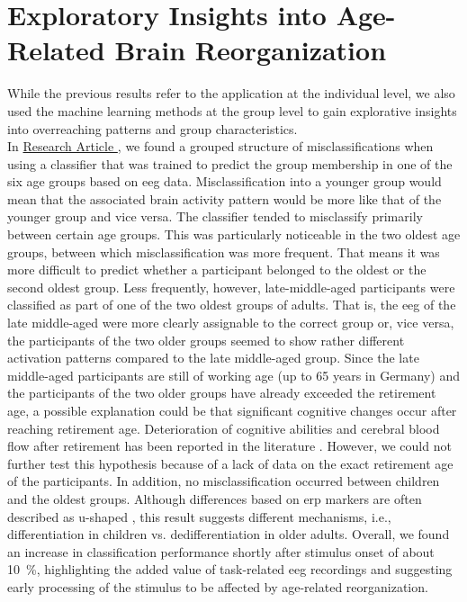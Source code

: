 \section{Exploratory Insights into Age-Related Brain Reorganization}
While the previous results refer to the application at the individual level, we also used the machine learning methods at the group level to gain explorative insights into overreaching patterns and group characteristics.\\
In \hyperref[results:paperII]{Research Article }, we found a grouped structure of misclassifications when using a classifier that was trained to predict the group membership in one of the six age groups based on \gls{eeg} data. Misclassification into a younger group would mean that the associated brain activity pattern would be more like that of the younger group and vice versa. The classifier tended to misclassify primarily between certain age groups. This was particularly noticeable in the two oldest age groups, between which misclassification was more frequent. That means it was more difficult to predict whether a participant belonged to the oldest or the second oldest group. Less frequently, however, late-middle-aged participants were classified as part of one of the two oldest groups of adults. That is, the \gls{eeg} of the late middle-aged were more clearly assignable to the correct group or, vice versa, the participants of the two older groups seemed to show rather different activation patterns compared to the late middle-aged group. Since the late middle-aged participants are still of working age (up to 65 years in Germany) and the participants of the two older groups have already exceeded the retirement age, a possible explanation could be that significant cognitive changes occur after reaching retirement age. Deterioration of cognitive abilities and cerebral blood flow after retirement has been reported in the literature \cite{Celidoni2017, Rohwedder2010, Rogers1990}. However, we could not further test this hypothesis because of a lack of data on the exact retirement age of the participants. In addition, no misclassification occurred between children and the oldest groups. Although differences based on \gls{erp} markers are often described as u-shaped \cite{Mueller2008, Reuter2019}, this result suggests different mechanisms, i.e., differentiation in children vs. dedifferentiation in older adults. Overall, we found an increase in classification performance shortly after stimulus onset of about 10~\%, highlighting the added value of task-related \gls{eeg} recordings and suggesting early processing of the stimulus to be affected by age-related reorganization.\\
